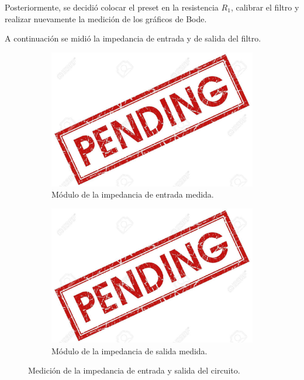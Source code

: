 Posteriormente, se decidió colocar el preset en la resistencia $R_1$, calibrar el filtro y realizar nuevamente la medición de los gráficos de Bode.


A continuación se midió la impedancia de entrada y de salida del filtro.

\begin{figure}[H]
	\centering
	\begin{subfigure}[t]{0.49\textwidth}
	\centering
		\includegraphics[width=1.1\textwidth]{Imagenes/pend.jpg}
		\caption{Módulo de la impedancia de entrada medida.}
	\end{subfigure}
	\begin{subfigure}[t]{0.49\textwidth}
	\centering
		\includegraphics[width=1.1\textwidth]{Imagenes/pend.jpg}
		\caption{Módulo de la impedancia de salida medida.}
	\end{subfigure}
	\label{fig:zin_zout}
	\caption{Medición de la impedancia de entrada y salida del circuito.}
\end{figure}

